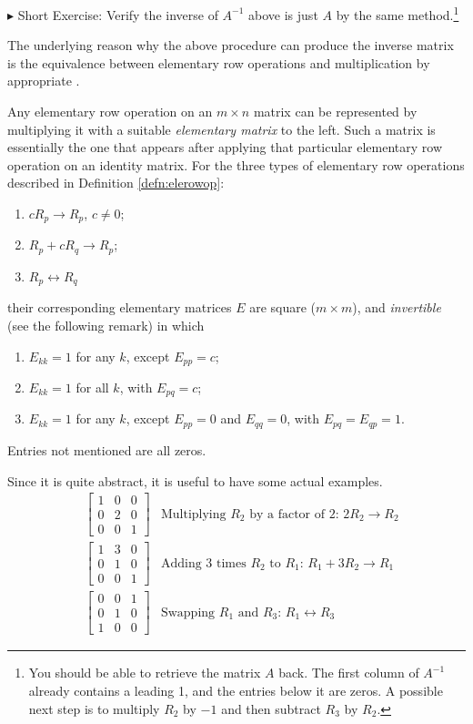 $\blacktriangleright$ Short Exercise: Verify the inverse of $A^{-1}$ above is just $A$ by the same method.\footnote{You should be able to retrieve the matrix $A$ back. The first column of $A^{-1}$ already contains a leading 1, and the entries below it are zeros. A possible next step is to multiply $R_2$ by $-1$ and then subtract $R_3$ by $R_2$.}\par
The underlying reason why the above procedure can produce the inverse matrix is the equivalence between elementary row operations and multiplication by appropriate .
\begin{defn}
\label{defn:elementarymat}
Any elementary row operation on an $m \times n$ matrix can be represented by multiplying it with a suitable \textit{elementary matrix} to the left. Such a matrix is essentially the one that appears after applying that particular elementary row operation on an identity matrix. For the three types of elementary row operations described in Definition \ref{defn:elerowop}:
\begin{enumerate}
\item $cR_{p} \to R_{p}$, $c \neq 0$;
\item $R_{p} + cR_{q} \to R_{p}$;
\item $R_{p} \leftrightarrow R_{q}$
\end{enumerate}
their corresponding elementary matrices $E$ are square ($m \times m$), and \textit{invertible} (see the following remark) in which
\begin{enumerate}
\item $E_{kk} = 1$ for any $k$, except $E_{pp} = c$;
\item $E_{kk} = 1$ for all $k$, with $E_{pq} = c$;
\item $E_{kk} = 1$ for any $k$, except $E_{pp} = 0$ and $E_{qq} = 0$, with $E_{pq} = E_{qp} = 1$. 
\end{enumerate}
Entries not mentioned are all zeros.
\end{defn}
Since it is quite abstract, it is useful to have some actual examples.
\begin{align*}
&
\begin{bmatrix}
1 & 0 & 0 \\
0 & 2 & 0 \\
0 & 0 & 1
\end{bmatrix} & \text{Multiplying $R_2$ by a factor of $2$: } 2R_2 \to R_2 \\
&
\begin{bmatrix}
1 & 3 & 0 \\
0 & 1 & 0 \\
0 & 0 & 1
\end{bmatrix} & \text{Adding 3 times $R_2$ to $R_1$: } R_1 + 3R_2 \to R_1 \\
&
\begin{bmatrix}
0 & 0 & 1 \\
0 & 1 & 0 \\
1 & 0 & 0
\end{bmatrix} & \text{Swapping $R_1$ and $R_3$: } R_1 \leftrightarrow R_3 
\end{align*}
